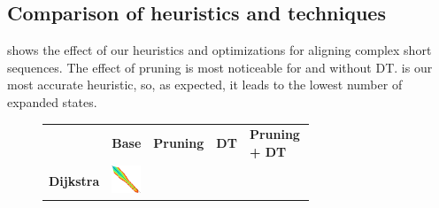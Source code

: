 \subsection{Comparison of heuristics and techniques}\label{app:comparison}
 shows the effect of our heuristics and optimizations for
aligning complex short sequences. The effect of pruning is most noticeable for
\CSH and \GCH without DT. \GCH is our most accurate heuristic, so, as expected,
it leads to the lowest number of expanded states.

\begin{figure}[H]
  \centering
  \begin{tabular}{l>{\centering}m{0.12\linewidth}>{\centering}m{0.12\linewidth}>{\centering}m{0.12\linewidth}>{\centering\arraybackslash}m{0.35\linewidth}}
    & \textbf{Base} & \textbf{Pruning} & \textbf{DT} & \textbf{Pruning + DT} \\
    \textbf{Dijkstra} &
    \includegraphics[scale=0.09]{imgs/comparison/dijkstra-noprune.png} &
    &

\end{tabular}
\end{figure}

